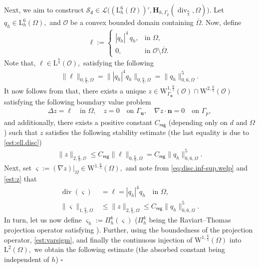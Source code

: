 \documentclass[11pt, reqno, a4paper, twoside]{article}
\newcommand{\bn}{\boldsymbol{n}}
\newcommand{\bu}{\boldsymbol{u}}
\newcommand{\rL}{\mathrm{L}}
\newcommand{\rW}{\mathrm{W}}
\newcommand{\bH}{\mathbf{H}}
\newcommand{\cL}{\mathcal{L}}
\newcommand{\cS}{\mathcal{S}}
\newcommand\vdiv{\mathop{\mathrm{div}}\nolimits}
\newenvironment{proof}{\noindent{\it Proof.}}{\hfill$\square$}
\numberwithin{equation}{section}
\numberwithin{remark}{section}
\numberwithin{figure}{section}
\numberwithin{table}{section}
\begin{document}
{{\begin{proof}
Next, we aim to construct \(\cS_{\mathsf{d}}\in\cL\bigl((\rL_h^6(\Omega))',\bH_{h,\Gamma_p}(\vdiv_{\frac65},\Omega)\bigr)\).
{Let \(q_h\in\rL^6_h(\Omega),\) and \(\mathcal{O}\) be a convex bounded domain containing \(\overline{\Omega}.\) Now, define 
\begin{align}\label{def:ell}
    \ell :=
\begin{cases}
|q_h|^4\, q_h, & \text{in } \Omega,\\[2pt]
0, & \text{in } \mathcal{O} \setminus \overline{\Omega}.
\end{cases}
\end{align}
Note that, \(\ell\in\rL^{\frac65}(\mathcal{O}),\) satisfying the following 
\begin{align}\label{est:ell.disc}
\|\ell\|_{0,\frac65,\Omega}=\||q_h|^4q_h\|_{0,\frac65,\Omega}=\|q_h\|^5_{0,6,\Omega}.
\end{align}
It now follows from \cite[Corollary~1]{fromm1993potential} that, there exists a unique \(z\in \rW_{\Gamma_{\bu}}^{1,\frac65}(\mathcal{O})\cap\rW^{2,\frac65}(\mathcal{O})\) satisfying the following boundary value problem
\begin{align}\label{eq:disc.inf-sup.welp}
    \Delta z = \ell \quad \text{in } \Omega,\quad z=0\quad \text{on } \Gamma_{\bu},\quad \nabla z\cdot\bn=0\quad \text{on } \Gamma_p,
\end{align}
and additionally, there exists a positive constant \(C_{\mathsf{reg}}\) (depending only on \(d\) and \(\Omega\)) such that \(z\) satisfies the following  stability estimate (the last equality is due to \eqref{est:ell.disc})
\begin{align}\label{est:z}
\|z\|_{2,\frac65,\mathcal{O}}\leq C_{\mathsf{reg}}\|\ell\|_{0,\frac65,\Omega}=C_{\mathsf{reg}}\|q_h\|^5_{0,6,\Omega}.
\end{align}
Next, set \(\varsigma:=(\nabla z)|_{\Omega}\in\rW^{1,\frac65}(\Omega),\) and note from \eqref{eq:disc.inf-sup.welp} and \eqref{est:z} that 
\begin{align}
    \vdiv(\varsigma)&=\ell=|q_h|^4q_h \quad \text{in } \Omega, \label{est:div.varsigma}\\ \|\varsigma\|_{1,\frac65,\Omega}&\leq\|z\|_{2,\frac65,\Omega}\leq C_{\mathsf{reg}}\|q_h\|^5_{0,6,\Omega}.\label{est:varsigm} 
\end{align}
In turn, let us now define \(\varsigma_h:=\Pi^k_h(\varsigma)\) (\( \Pi_h^k\) being the Raviart--Thomas projection operator satisfying \cite[Equation~5.38, Equation~5.39]{colmenares2020banach}). Further, using the boundedness of the projection operator,  \eqref{est:varsigm}, and finally the continuous injection of \(\rW^{1,\frac65}(\Omega)\) into \(\rL^2(\Omega),\)  we obtain the following estimate (the absorbed constant being independent of \(h\))
}
\end{proof}}}
\end{document}
